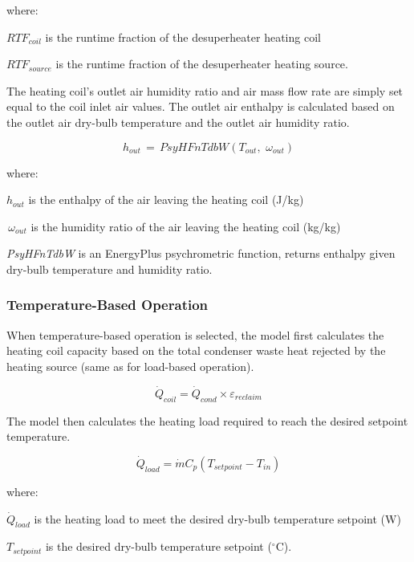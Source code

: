 where:

\(RT{F_{coil}}\) is the runtime fraction of the desuperheater heating coil

\(RT{F_{source}}\) is the runtime fraction of the desuperheater heating source.

The heating coil's outlet air humidity ratio and air mass flow rate are simply set equal to the coil inlet air values. The outlet air enthalpy is calculated based on the outlet air dry-bulb temperature and the outlet air humidity ratio.

\begin{equation}
{h_{out}}\, = \,PsyHFnTdbW({T_{out}},\,\,{\omega_{out}})
\end{equation}

where:

\({h_{out}}\) is the enthalpy of the air leaving the heating coil (J/kg)

\(\,{\omega_{out}}\) is the humidity ratio of the air leaving the heating coil (kg/kg)

\emph{PsyHFnTdbW} is an EnergyPlus psychrometric function, returns enthalpy given dry-bulb temperature and humidity ratio.

\subsubsection{Temperature-Based Operation}\label{temperature-based-operation}

When temperature-based operation is selected, the model first calculates the heating coil capacity based on the total condenser waste heat rejected by the heating source (same as for load-based operation).

\begin{equation}
{\dot Q_{coil}} = {\dot Q_{cond}} \times {\varepsilon_{reclaim}}
\end{equation}

The model then calculates the heating load required to reach the desired setpoint temperature.

\begin{equation}
{\dot Q_{load}} = \dot m{C_p}\left( {{T_{setpoint}} - {T_{in}}} \right)
\end{equation}

where:

\({\dot Q_{load}}\) is the heating load to meet the desired dry-bulb temperature setpoint (W)

\({T_{setpoint}}\) is the desired dry-bulb temperature setpoint (\(^{\circ}\)C).

